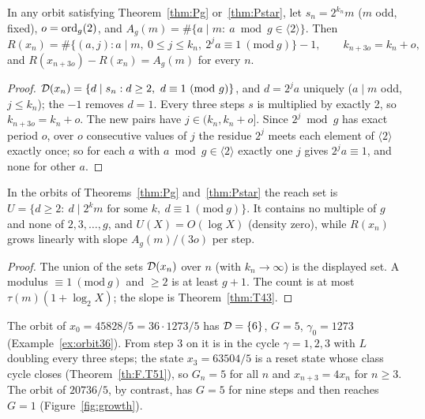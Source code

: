 \begin{theorem}\label{thm:T43}
In any orbit satisfying Theorem~\ref{thm:Pg} or~\ref{thm:Pstar}, let \(s_n=2^{k_n}m\) (\(m\) odd, fixed), \(o=\operatorname{ord}_g(2)\), and \(A_g(m)=\#\{a\mid m:\ a\bmod g\in\langle2\rangle\}\). Then
\[
R(x_n)=\#\{(a,j):a\mid m,\ 0\le j\le k_n,\ 2^ja\equiv1\ (\mathrm{mod}\ g)\}-1,\qquad k_{n+3o}=k_n+o,
\]
and \(R(x_{n+3o})-R(x_n)=A_g(m)\) for every \(n\).
\end{theorem}
\begin{proof}
\(\mathcal{D}(x_n)=\{d\mid s_n:d\ge2,\ d\equiv1\ (\mathrm{mod}\ g)\}\), and \(d=2^ja\) uniquely (\(a\mid m\) odd, \(j\le k_n\)); the \(-1\) removes \(d=1\). Every three steps \(s\) is multiplied by exactly 2, so \(k_{n+3o}=k_n+o\). The new pairs have \(j\in(k_n,k_n+o]\). Since \(2^j\bmod g\) has exact period \(o\), over \(o\) consecutive values of \(j\) the residue \(2^j\) meets each element of \(\langle2\rangle\) exactly once; so for each \(a\) with \(a\bmod g\in\langle2\rangle\) exactly one \(j\) gives \(2^ja\equiv1\), and none for other \(a\).
\end{proof}

\begin{theorem}\label{thm:T40}
In the orbits of Theorems~\ref{thm:Pg} and~\ref{thm:Pstar} the reach set is
\(U=\{d\ge2:\ d\mid2^km\text{ for some }k,\ d\equiv1\ (\mathrm{mod}\ g)\}\).
It contains no multiple of \(g\) and none of \(2,3,\dots,g\), and \(U(X)=O(\log X)\) (density zero), while \(R(x_n)\) grows linearly with slope \(A_g(m)/(3o)\) per step.
\end{theorem}
\begin{proof}
The union of the sets \(\mathcal{D}(x_n)\) over \(n\) (with \(k_n\to\infty\)) is the displayed set. A modulus \(\equiv1\ (\mathrm{mod}\ g)\) and \(\ge2\) is at least \(g+1\). The count is at most \(\tau(m)(1+\log_2X)\); the slope is Theorem~\ref{thm:T43}.
\end{proof}

\begin{example}\label{ex:natural}
The orbit of \(x_0=45828/5=36\cdot1273/5\) has \(\mathcal{D}=\{6\}\), \(G=5\), \(\gamma_0=1273\) (Example~\ref{ex:orbit36}). From step 3 on it is in the cycle \(\gamma=1,2,3\) with \(L\) doubling every three steps; the state \(x_3=63504/5\) is a reset state whose class cycle closes (Theorem~\ref{th:F.T51}), so \(G_n=5\) for all \(n\) and \(x_{n+3}=4x_n\) for \(n\ge3\). The orbit of \(20736/5\), by contrast, has \(G=5\) for nine steps and then reaches \(G=1\) (Figure~\ref{fig:growth}).
\end{example}

